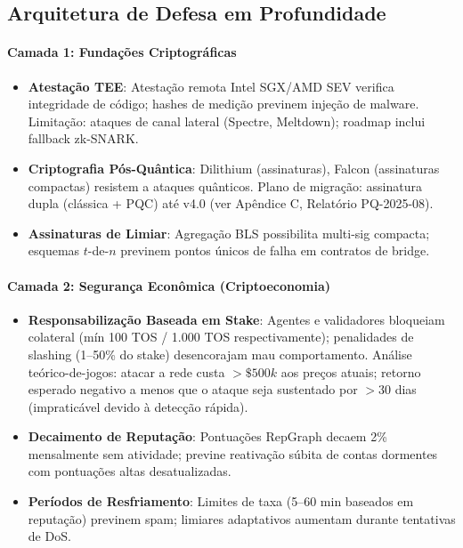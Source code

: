 \documentclass[11pt]{article}
\begin{document}
\begin{itemize}[noitemsep]
\begin{itemize}[noitemsep]
\begin{itemize}[noitemsep]
\subsection{Arquitetura de Defesa em Profundidade}

\paragraph{Camada 1: Fundações Criptográficas}
\begin{itemize}[noitemsep]
  \item \textbf{Atestação TEE}: Atestação remota Intel SGX/AMD SEV verifica integridade de código; hashes de medição previnem injeção de malware. Limitação: ataques de canal lateral (Spectre, Meltdown); roadmap inclui fallback zk-SNARK.
  \item \textbf{Criptografia Pós-Quântica}: Dilithium (assinaturas), Falcon (assinaturas compactas) resistem a ataques quânticos. Plano de migração: assinatura dupla (clássica + PQC) até v4.0 (ver Apêndice C, Relatório PQ-2025-08).
  \item \textbf{Assinaturas de Limiar}: Agregação BLS possibilita multi-sig compacta; esquemas $t$-de-$n$ previnem pontos únicos de falha em contratos de bridge.
\end{itemize}

\paragraph{Camada 2: Segurança Econômica (Criptoeconomia)}
\begin{itemize}[noitemsep]
  \item \textbf{Responsabilização Baseada em Stake}: Agentes e validadores bloqueiam colateral (mín 100 TOS / 1.000 TOS respectivamente); penalidades de slashing (1--50\% do stake) desencorajam mau comportamento. Análise teórico-de-jogos: atacar a rede custa $>\$500k$ aos preços atuais; retorno esperado negativo a menos que o ataque seja sustentado por $>30$ dias (impraticável devido à detecção rápida).
  \item \textbf{Decaimento de Reputação}: Pontuações RepGraph decaem 2\% mensalmente sem atividade; previne reativação súbita de contas dormentes com pontuações altas desatualizadas.
  \item \textbf{Períodos de Resfriamento}: Limites de taxa (5--60 min baseados em reputação) previnem spam; limiares adaptativos aumentam durante tentativas de DoS.
\end{itemize}


\end{itemize}
\end{itemize}
\end{itemize}
\end{document}
